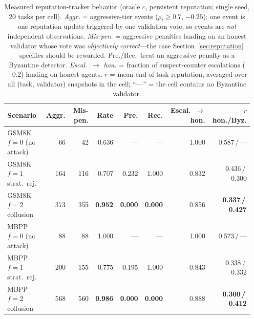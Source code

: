 \documentclass{article}
\begin{document}
\begin{table}[htbp]
\centering
\caption{Measured reputation-tracker behavior (oracle $c$, persistent reputation; single seed, 20 tasks per cell). \emph{Aggr.} = aggressive-tier events ($\rho_i \geq 0.7$, $-0.25$); one event is one reputation update triggered by one validation vote, so events are \emph{not} independent observations. \emph{Mis-pen.} = aggressive penalties landing on an honest validator whose vote was \emph{objectively correct}---the case Section~\ref{sec:reputation} specifies should be rewarded. Pre./Rec.\ treat an aggressive penalty as a Byzantine detector. \emph{Escal.\ $\to$ hon.} = fraction of suspect-counter escalations ($-0.2$) landing on honest agents. $r$ = mean end-of-task reputation, averaged over all (task, validator) snapshots in the cell; ``---'' = the cell contains no Byzantine validator.}
\label{tab:rep_ablation}
\setlength{\tabcolsep}{3.5pt}
\footnotesize
\begin{tabular}{lrrrrrrr}
\toprule
\textbf{Scenario} & \textbf{Aggr.} & \textbf{Mis-pen.} & \textbf{Rate} & \textbf{Pre.} & \textbf{Rec.} & \textbf{Escal.\ $\to$ hon.} & \textbf{$r$ hon./Byz.} \\
\midrule
GSM8K $f{=}0$ (no attack) & 66 & 42 & 0.636 & --- & --- & 1.000 & 0.587\,/\,--- \\
GSM8K $f{=}1$ strat.\ rej. & 164 & 116 & 0.707 & 0.232 & 1.000 & 0.832 & 0.436\,/\,0.300 \\
GSM8K $f{=}2$ collusion & 373 & 355 & \textbf{0.952} & \textbf{0.000} & \textbf{0.000} & 0.856 & \textbf{0.337\,/\,0.427} \\
MBPP $f{=}0$ (no attack) & 88 & 88 & 1.000 & --- & --- & 1.000 & 0.573\,/\,--- \\
MBPP $f{=}1$ strat.\ rej. & 200 & 155 & 0.775 & 0.195 & 1.000 & 0.843 & 0.338\,/\,0.332 \\
MBPP $f{=}2$ collusion & 568 & 560 & \textbf{0.986} & \textbf{0.000} & \textbf{0.000} & 0.888 & \textbf{0.300\,/\,0.412} \\
\bottomrule
\end{tabular}
\end{table}
\end{document}
